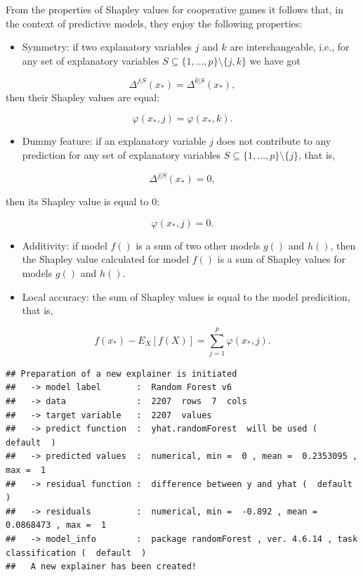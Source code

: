 \documentclass[12pt,]{krantz}
\providecommand{\tightlist}{%
  \setlength{\itemsep}{0pt}\setlength{\parskip}{0pt}}
\begin{document}
From the properties of Shapley values for cooperative games it follows that, in the context of predictive models, they enjoy the following properties:

\begin{itemize}
\tightlist
\item
  Symmetry: if two explanatory variables \(j\) and \(k\) are interchangeable, i.e., for any set of explanatory variables \(S \subseteq \{1,\dots,p\}\setminus \{j,k\}\) we have got
\end{itemize}

\[
\Delta^{j|S}(x_*) = \Delta^{k|S}(x_*),
\]
then their Shapley values are equal:

\[
\varphi(x_*,j) = \varphi(x_*,k).
\]

\begin{itemize}
\tightlist
\item
  Dummy feature: if an explanatory variable \(j\) does not contribute to any prediction for any set of explanatory variables \(S \subseteq \{1,\dots,p\}\setminus \{j\}\), that is,
\end{itemize}

\[
\Delta^{j|S}(x_*) = 0,
\]

then its Shapley value is equal to 0:

\[
\varphi(x_*,j) = 0.
\]

\begin{itemize}
\item
  Additivity: if model \(f()\) is a sum of two other models \(g()\) and \(h()\), then the Shapley value calculated for model \(f()\) is a sum of Shapley values for models \(g()\) and \(h()\).
\item
  Local accuracy: the sum of Shapley values is equal to the model predicition, that is,
\end{itemize}

\[
f(x_*) - E_X[f(X)] = \sum_{j=1}^p   \varphi(x_*,j). 
\]

\begin{verbatim}
## Preparation of a new explainer is initiated
##   -> model label       :  Random Forest v6 
##   -> data              :  2207  rows  7  cols 
##   -> target variable   :  2207  values 
##   -> predict function  :  yhat.randomForest  will be used (  default  )
##   -> predicted values  :  numerical, min =  0 , mean =  0.2353095 , max =  1  
##   -> residual function :  difference between y and yhat (  default  )
##   -> residuals         :  numerical, min =  -0.892 , mean =  0.0868473 , max =  1  
##   -> model_info        :  package randomForest , ver. 4.6.14 , task classification (  default  ) 
##   A new explainer has been created!
\end{verbatim}
\end{document}
